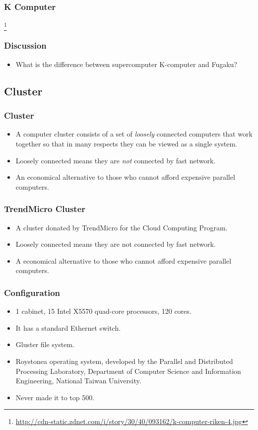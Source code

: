 \documentclass{beamer}
\begin{document}
\begin{CJK}{UTF8}{bsmi}
\begin{frame}
\frametitle{K Computer}
\centerline{}
\footnote{\url{http://cdn-static.zdnet.com/i/story/30/40/093162/k-computer-riken-4.jpg}}
\end{frame}

\begin{frame}
\frametitle{Discussion}
\begin{itemize}
\item What is the difference between supercomputer K-computer and Fugaku?
\end{itemize}
\end{frame}


\subsection{Cluster}

\begin{frame}
\frametitle{Cluster}
\begin{itemize}
\item A computer cluster consists of a set of {\em loosely} connected
  computers that work together so that in many respects they can be
  viewed as a single system.
\item Loosely connected means they are {\em not} connected by fast
  network.
\item An economical alternative to those who cannot afford expensive
  parallel computers.
\end{itemize}
\end{frame}

\begin{frame}
\frametitle{TrendMicro Cluster}
\begin{itemize}
\item A cluster donated by TrendMicro for the Cloud Computing Program.
\item Loosely connected means they are not connected by fast network.
\item A economical alternative to those who cannot afford expensive
  parallel computers.
\end{itemize}
\end{frame}

\begin{frame}
\frametitle{Configuration}
\begin{itemize}
\item 1 cabinet, 15 Intel X5570 quad-core processors, 120 cores.
\item It has a standard Ethernet switch.
\item Gluster file system.
\item Roystonea operating system, developed by the Parallel and Distributed Processing Laboratory, Department of Computer Science and Information Engineering, National Taiwan University.
\item Never made it to top 500.
\end{itemize}
\end{frame}


\end{CJK}
\end{document}
